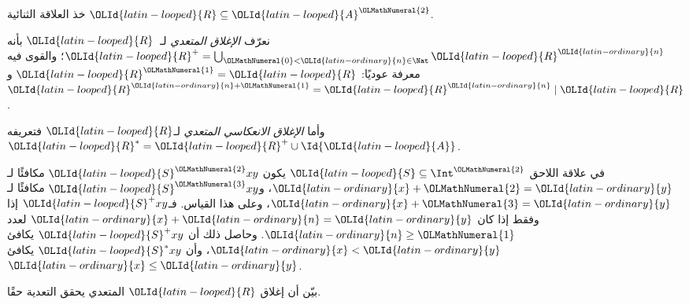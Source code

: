 \documentclass[../../../include/open-logic-section]{subfiles}
\begin{document}
\begin{defn}
خذ العلاقة الثنائية ${\OLId{latin-looped}{R}} \subseteq {\OLId{latin-looped}{A}}^{\OLMathNumeral{2}}$.

نعرّف \emph{الإغلاق المتعدي} لـ~${\OLId{latin-looped}{R}}$ بأنه ${\OLId{latin-looped}{R}}^+ = \bigcup_{{\OLMathNumeral{0}} < {\OLId{latin-ordinary}{n}} \in
\Nat} {\OLId{latin-looped}{R}}^{\OLId{latin-ordinary}{n}}$؛ والقوى فيه معرفة عوديًا: ${\OLId{latin-looped}{R}}^{\OLMathNumeral{1}} = {\OLId{latin-looped}{R}}$ و${\OLId{latin-looped}{R}}^{{\OLId{latin-ordinary}{n}}+{\OLMathNumeral{1}}} = {\OLId{latin-looped}{R}}^{\OLId{latin-ordinary}{n}}
\mid {\OLId{latin-looped}{R}}$.

وأما \emph{الإغلاق الانعكاسي المتعدي} لـ${\OLId{latin-looped}{R}}$ فتعريفه ${\OLId{latin-looped}{R}}^* = {\OLId{latin-looped}{R}}^+ \cup
\Id{{\OLId{latin-looped}{A}}}$.
\end{defn}

\begin{ex}
في علاقة اللاحق ${\OLId{latin-looped}{S}} \subseteq \Int^{\OLMathNumeral{2}}$ يكون ${\OLId{latin-looped}{S}}^{\OLMathNumeral{2}}xy$ مكافئًا لـ${\OLId{latin-ordinary}{x}} + {\OLMathNumeral{2}} =
{\OLId{latin-ordinary}{y}}$، و${\OLId{latin-looped}{S}}^{\OLMathNumeral{3}}xy$ مكافئًا لـ${\OLId{latin-ordinary}{x}} + {\OLMathNumeral{3}} = {\OLId{latin-ordinary}{y}}$، وعلى هذا القياس.
فـ${\OLId{latin-looped}{S}}^+xy$ إذا وفقط إذا كان ${\OLId{latin-ordinary}{x}} + {\OLId{latin-ordinary}{n}} = {\OLId{latin-ordinary}{y}}$ لعدد ${\OLId{latin-ordinary}{n}} \geq {\OLMathNumeral{1}}$.
وحاصل ذلك أن ${\OLId{latin-looped}{S}}^+xy$ يكافئ ${\OLId{latin-ordinary}{x}} < {\OLId{latin-ordinary}{y}}$، وأن ${\OLId{latin-looped}{S}}^*xy$ يكافئ ${\OLId{latin-ordinary}{x}} \le
{\OLId{latin-ordinary}{y}}$.
\end{ex}

\begin{prob}
بيّن أن إغلاق ${\OLId{latin-looped}{R}}$ المتعدي يحقق التعدية حقًا.
\end{prob}
\end{document}
